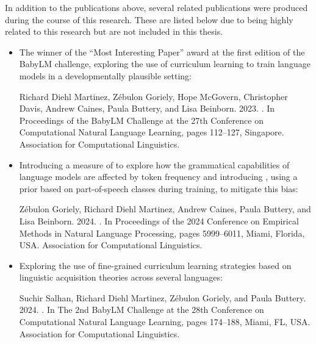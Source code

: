 In addition to the publications above, several related publications were produced during the course of this research. These are listed below due to being highly related to this research but are not included in this thesis.

\begin{itemize}
\item The winner of the \enquote{Most Interesting Paper} award at the first edition of the BabyLM challenge, exploring the use of curriculum learning to train language models in a developmentally plausible setting:
\begin{mdframed}[linewidth=1pt]
    Richard Diehl Martinez, Z\'ebulon Goriely, Hope McGovern, Christopher Davis, Andrew Caines, Paula Buttery, and Lisa Beinborn. 2023. \href{https://aclanthology.org/2023.conll-babylm.10/}{}. In Proceedings of the BabyLM Challenge at the 27th Conference on Computational Natural Language Learning, pages 112--127, Singapore. Association for Computational Linguistics.
\end{mdframed}

\item Introducing a measure of  to explore how the grammatical capabilities of language models are affected by token frequency and introducing , using a prior based on part-of-speech classes during training, to mitigate this bias:
\begin{mdframed}[linewidth=1pt]
    Z\'ebulon Goriely, Richard Diehl Martinez, Andrew Caines, Paula Buttery, and Lisa Beinborn. 2024. \href{https://aclanthology.org/2024.emnlp-main.344/}{}. In Proceedings of the 2024 Conference on Empirical Methods in Natural Language Processing, pages 5999–6011, Miami, Florida, USA. Association for Computational Linguistics.
\end{mdframed}

\item Exploring the use of fine-grained curriculum learning strategies based on linguistic acquisition theories across several languages:
\begin{mdframed}[linewidth=1pt]
    Suchir Salhan, Richard Diehl Martinez, Z\'ebulon Goriely, and Paula Buttery. 2024. \href{https://aclanthology.org/2024.conll-babylm.15/}{}. In The 2nd BabyLM Challenge at the 28th Conference on Computational Natural Language Learning, pages 174--188, Miami, FL, USA. Association for Computational Linguistics.
\end{mdframed}


\end{itemize}
